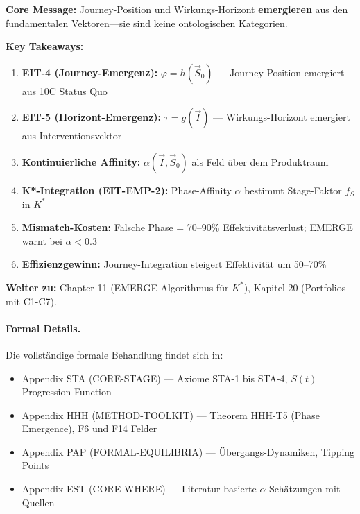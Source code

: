 \begin{tcolorbox}[colback=green!10!white, colframe=green!75!black,
    title=Key Points (Emergent Temporal Theory)]

\textbf{Core Message:} Journey-Position und Wirkungs-Horizont \textbf{emergieren} aus den fundamentalen Vektoren---sie sind keine ontologischen Kategorien.

\textbf{Key Takeaways:}
\begin{enumerate}
\item \textbf{EIT-4 (Journey-Emergenz):} $\varphi = h(\vec{S}_0)$ --- Journey-Position emergiert aus 10C Status Quo
\item \textbf{EIT-5 (Horizont-Emergenz):} $\tau = g(\vec{I})$ --- Wirkungs-Horizont emergiert aus Interventionsvektor
\item \textbf{Kontinuierliche Affinity:} $\alpha(\vec{I}, \vec{S}_0)$ als Feld über dem Produktraum
\item \textbf{K*-Integration (EIT-EMP-2):} Phase-Affinity $\alpha$ bestimmt Stage-Faktor $f_S$ in $K^*$
\item \textbf{Mismatch-Kosten:} Falsche Phase = 70--90\% Effektivitätsverlust; EMERGE warnt bei $\alpha < 0.3$
\item \textbf{Effizienzgewinn:} Journey-Integration steigert Effektivität um 50--70\%
\end{enumerate}

\textbf{Weiter zu:} Chapter 11 (EMERGE-Algorithmus für $K^*$), Kapitel 20 (Portfolios mit C1-C7).

\end{tcolorbox}

\paragraph{Formal Details.}
Die vollständige formale Behandlung findet sich in:
\begin{itemize}[nosep]
\item Appendix STA (CORE-STAGE) --- Axiome STA-1 bis STA-4, $S(t)$ Progression Function
\item Appendix HHH (METHOD-TOOLKIT) --- Theorem HHH-T5 (Phase Emergence), F6 und F14 Felder
\item Appendix PAP (FORMAL-EQUILIBRIA) --- Übergangs-Dynamiken, Tipping Points
\item Appendix EST (CORE-WHERE) --- Literatur-basierte $\alpha$-Schätzungen mit Quellen
\end{itemize}

